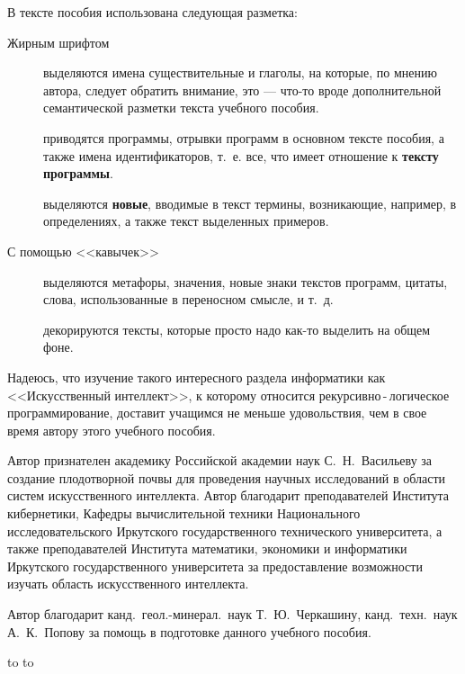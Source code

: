 \documentclass[12pt, openany, twoside]{book} %
\begin{document}
В тексте пособия использована следующая разметка:
\begin{description}
\item[Жирным шрифтом] выделяются имена существительные и глаголы, на которые, по мнению автора, следует обратить внимание, это --- что-то вроде дополнительной семантической разметки текста учебного пособия.
\item[] приводятся программы, отрывки программ в основном тексте пособия, а также имена идентификаторов, т.~е. все, что имеет отношение к {\bf тексту программы}.
\item[] выделяются {\bf новые}, вводимые в текст термины, возникающие, например, в определениях, а также текст выделенных примеров.
\item[\normalfont С помощью <<кавычек>>] выделяются метафоры, значения, новые знаки текстов программ, цитаты, слова, использованные в переносном смысле, и т.~д.
\item[] декориру\-ют\-ся тексты, которые просто надо как-то выделить на общем фоне.
\end{description}

Надеюсь, что изучение такого интересного раздела информатики как <<Искусственный интеллект>>, к которому относится рекурсивно\,{}-\,{}логическое программирование, доставит учащимся не меньше удовольствия, чем в свое время автору этого учебного пособия.

Автор признателен академику Российской академии наук С.~Н.~Васильеву за создание плодотворной почвы для проведения научных исследований в области систем искусственного интеллекта. Автор благодарит преподавателей Института кибернетики, Кафедры вычислительной техники Национального исследовательского Иркутского государственного технического университета, а также преподавателей Института математики, экономики и информатики Иркутского государственного университета за предоставление возможности изучать область искусственного интеллекта.

Автор благодарит канд.~геол.-минерал.~наук Т.~Ю.~Черкашину, канд.~техн.~наук  А.~К.~Попову за помощь в подготовке данного учебного пособия.

\medskip
\noindent\hbox to \linewidth{\hfill\sf С.~н.~с. ИДСТУ СО РАН, доцент кафедр ВТ ИрГТУ и ИТ ИМЭИ ИГУ}
\noindent\hbox to \linewidth{\hfill\sf канд.~техн.~наук Е.~А.~Черкашин}
\end{document}
